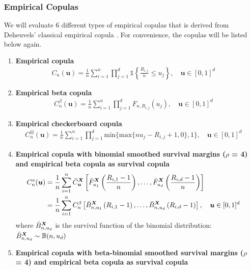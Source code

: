 \documentclass[12pt]{report}
\newcommand{\1}{\mathbf{1}}
\begin{document}
\begin{flushleft}
\subsubsection{Empirical Copulas}

We will evaluate 6 different types of empirical copulas that is derived from Deheuvels' classical empirical copula \parencite{DeheuvelsEC}. For convenience, the copulas will be listed below again.
\begin{enumerate}
\item \textbf{Empirical copula}
\begin{align*}
C_{n}(\boldsymbol{u}) = \frac{1}{n} \sum\limits_{i = 1}^{n} \prod\limits_{j = 1}^{d} \mathds{1}\left\{ \frac{R_{i,j}}{n} \le u_{j} \right\}, \quad \boldsymbol{u} \in [0,1]^{d}
\end{align*}
\item \textbf{Empirical beta copula}
\begin{align*}
C^{\beta}_{n}(\boldsymbol{u}) = \frac{1}{n} \sum\limits_{i = 1}^{n} \prod\limits_{j = 1}^{d} F_{n,R_{i,j}}(u_{j}), \quad \boldsymbol{u} \in [0,1]^{d}
\end{align*}
\item \textbf{Empirical checkerboard copula}
\begin{align*}
C_{n}^{\boxplus}(\boldsymbol{u}) = \frac{1}{n} \sum\limits_{i = 1}^{n} \prod\limits_{j = 1}^{d} \mathrm{min} \{ \mathrm{max} \{ n u_{j} - R_{i,j} + 1, 0 \}, 1 \}, \quad \boldsymbol{u} \in [0,1]^{d}
\end{align*}
\item \textbf{Empirical copula with binomial smoothed survival margins ($\rho$ = 4) and empirical beta copula as survival copula}
\begin{align*}
C_{n}^{v}(\boldsymbol{u}) &= \frac{1}{n} \sum\limits_{i = 1}^{n} \Tilde{C}_{\boldsymbol{u}}^{\boldsymbol{X}} \left[\Bar{F}_{u_{1}}^{\boldsymbol{X}}\left(\frac{R_{i,1} - 1}{n}\right), \dots, \Bar{F}_{u_{d}}^{\boldsymbol{X}}\left(\frac{R_{i,d} - 1}{n}\right) \right] \\
&= \frac{1}{n} \sum\limits_{i = 1}^{n} C_{n}^{\beta} \left[\Bar{B}_{n, u_{1}}^{\boldsymbol{X}}\left(R_{i,1} - 1\right), \dots, \Bar{B}_{n, u_{d}}^{\boldsymbol{X}}\left(R_{i,d} - 1\right) \right], \quad \boldsymbol{u} \in [0,1]^{d}
\end{align*}
where $\Bar{B}_{n, u_{d}}^{\boldsymbol{X}}$ is the survival function of the binomial distribution: $\Bar{B}_{n, u_{d}}^{\boldsymbol{X}} \sim \mathbb{B}(n, u_{d})$
\item \textbf{Empirical copula with beta-binomial smoothed survival margins ($\rho$ = 4) and empirical beta copula as survival copula}

\end{enumerate}
\end{flushleft}
\end{document}
